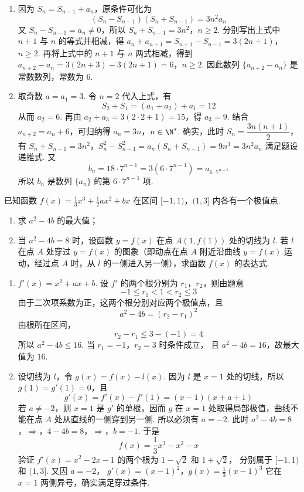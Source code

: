 \begin{solution}
\begin{enumerate}
\item 因为 \(S_n=S_{n-1}+a_n\)，原条件可化为
\[
(S_n-S_{n-1})(S_n+S_{n-1})=3n^2a_n
\]
又 \(S_n-S_{n-1}=a_n\ne0\)，所以
\(S_n+S_{n-1}=3n^2\)，\(n\geqslant2\).
分别写出上式中 \(n+1\) 与 \(n\) 的等式并相减，得
\(a_n+a_{n+1}=S_{n+1}-S_{n-1}=3(2n+1)\)，\(n\geqslant2\).
再将上式中的 \(n+1\) 与 \(n\) 两式相减，得到
\(a_{n+2}-a_n=3(2n+3)-3(2n+1)=6\)，\(n\geqslant2\).
因此数列 \(\{a_{n+2}-a_n\}\) 是常数数列，常数为 \(6\).
\item 取奇数 \(a=a_1=3\). 令 \(n=2\) 代入上式，有
\[
S_2+S_1=(a_1+a_2)+a_1=12
\]
从而 \(a_2=6\). 再由 \(a_2+a_3=3(2\cdot2+1)=15\)，得 \(a_3=9\).
结合 \(a_{n+2}=a_n+6\)，可归纳得
\(a_n=3n\)，\(n\in\N^*\).
确实，此时 \(S_n=\dfrac{3n(n+1)}2\)，有
\(S_n+S_{n-1}=3n^2\)，\(S_n^2-S_{n-1}^2=a_n(S_n+S_{n-1})=9n^3=3n^2a_n\)
满足题设递推式. 又
\[
b_n=18\cdot7^{n-1}=3\left(6\cdot7^{n-1}\right)
=a_{6\cdot7^{n-1}}
\]
所以 \(b_n\) 是数列 \(\{a_n\}\) 的第 \(6\cdot7^{n-1}\) 项.
\end{enumerate}
\end{solution}

\begin{problem}
已知函数 \( f(x) = \frac{1}{3} x^3 + \frac{1}{2} ax^2 + bx \) 在区间 \([-1, 1)\)，\((1, 3]\) 内各有一个极值点.

\begin{enumerate}
\item 求 \(a^2 - 4b\) 的最大值；
\item 当 \(a^2 - 4b = 8\) 时，设函数 \(y = f(x)\) 在点 \(A(1, f(1))\) 处的切线为 \(l\). 若 \(l\) 在点 \(A\) 处穿过 \(y = f(x)\) 的图象（即动点在点 \(A\) 附近沿曲线 \(y = f(x)\) 运动，经过点 \(A\) 时，从 \(l\) 的一侧进入另一侧），求函数 \(f(x)\) 的表达式.
\end{enumerate}
\end{problem}

\begin{solution}
\begin{enumerate}
\item \(f'(x)=x^2+ax+b\). 设 \(f'\) 的两个根分别为
\(r_1\)，\(r_2\)，则由题意
\[
-1\leqslant r_1<1<r_2\leqslant3
\]
由于二次项系数为正，这两个根分别对应两个极值点，且
\[
a^2-4b=(r_2-r_1)^2
\]
由根所在区间，
\[
r_2-r_1\leqslant3-(-1)=4
\]
所以 \(a^2-4b\leqslant16\). 当 \(r_1=-1\)，\(r_2=3\) 时条件成立，
且 \(a^2-4b=16\)，故最大值为 \(16\).
\item 设切线为 \(l\)，令 \(g(x)=f(x)-l(x)\). 因为 \(l\) 是
\(x=1\) 处的切线，所以 \(g(1)=g'(1)=0\)，且
\[
g'(x)=f'(x)-f'(1)
=(x-1)(x+a+1)
\]
若 \(a\ne-2\)，则 \(x=1\) 是 \(g'\) 的单根，因而 \(g\) 在
\(x=1\) 处取得局部极值，曲线不能在点 \(A\) 处从直线的一侧穿到另一侧.
所以必须有 \(a=-2\). 此时
\(a^2-4b=8\)，\(\Longrightarrow\)，\(4-4b=8\)，\(\Longrightarrow\)，\(b=-1\).
于是
\[
f(x)=\frac13x^3-x^2-x
\]
验证 \(f'(x)=x^2-2x-1\) 的两个根为 \(1-\sqrt2\) 和 \(1+\sqrt2\)，
分别属于 \([-1,1)\) 和 \((1,3]\). 又因 \(a=-2\)，
\(g'(x)=(x-1)^2\)，\(g(x)=\frac13(x-1)^3\)
它在 \(x=1\) 两侧异号，确实满足穿过条件.
\end{enumerate}
\end{solution}
